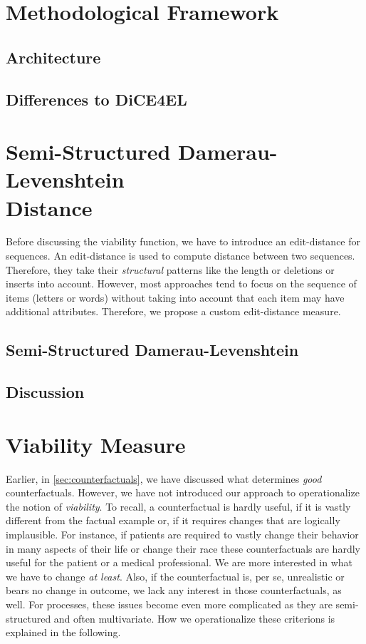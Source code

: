 \documentclass[12pt,a4paper]{report}
\begin{document}
\section{Methodological Framework}
\label{sec:framework}
\subsection{Architecture}


\subsection{Differences to DiCE4EL}


\section{Semi-Structured Damerau-Levenshtein \\ Distance}
\label{sec:ssdld}
Before discussing the viability function, we have to introduce an edit-distance for sequences. An edit-distance is used to compute distance between two sequences. Therefore, they take their \emph{structural} patterns like the length or deletions or inserts into account. However, most approaches tend to focus on the sequence of items (letters or words) without taking into account that each item may have additional attributes. Therefore, we propose a custom edit-distance measure. 

\subsection{Semi-Structured Damerau-Levenshtein}


\subsection{Discussion}


\section{Viability Measure}
\label{sec:viability}
Earlier, in \autoref{sec:counterfactuals}, we have discussed what determines \emph{good} counterfactuals. However, we have not introduced our approach to operationalize the notion of \emph{viability}. To recall, a counterfactual is hardly useful, if it is vastly different from the factual example or, if it requires changes that are logically implausible. For instance, if patients are required to vastly change their behavior in many aspects of their life or change their race these counterfactuals are hardly useful for the patient or a medical professional. We are more interested in what we have to change \emph{at least}. Also, if the counterfactual is, per se, unrealistic or bears no change in outcome, we lack any interest in those counterfactuals, as well. For processes, these issues become even more complicated as they are semi-structured and often multivariate. How we operationalize these criterions is explained in the following.
\end{document}
